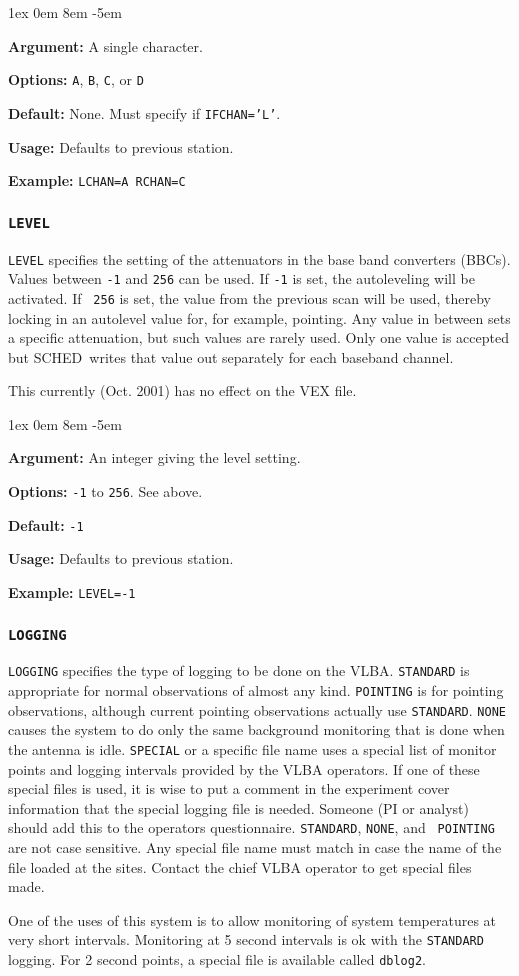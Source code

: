 \documentclass{report}
\newcommand{\schedb}{{\sc SCHED~}}
\newcommand{\rcwbox}[5]{
  \begin{list}{}{\parsep 1ex  \itemsep 0em
                 \leftmargin 8em  \itemindent -5em }
    \item {\bf Argument:} #1
    \item {\bf Options:}  #2
    \item {\bf Default:}  #3
    \item {\bf Usage:}    #4
    \item {\bf Example:}  #5
  \end{list}
}
\begin{document}
\rcwbox
{A single character.}
{{\tt A}, {\tt B}, {\tt C}, or {\tt D}}
{None. Must specify if {\tt IFCHAN='L'}.}
{Defaults to previous station.}
{{\tt LCHAN=A  RCHAN=C}}


\subsubsection{\label{SP:LEVEL}{\tt LEVEL}}

{\tt LEVEL} specifies the setting of the attenuators in the base band
converters (BBCs). Values between {\tt -1} and {\tt 256} can be
used. If {\tt -1} is set, the autoleveling will be activated. If {\tt
256} is set, the value from the previous scan will be used, thereby
locking in an autolevel value for, for example, pointing. Any value in
between sets a specific attenuation, but such values are rarely
used. Only one value is accepted but \schedb writes that value out
separately for each baseband channel.

This currently (Oct. 2001) has no effect on the VEX file.


\rcwbox
{An integer giving the level setting.}
{{\tt -1} to {\tt 256}. See above.}
{{\tt -1}}
{Defaults to previous station.}
{{\tt LEVEL=-1}}


\subsubsection{\label{SP:LOGGING}{\tt LOGGING}}

{\tt LOGGING} specifies the type of logging to be done on the
VLBA. {\tt STANDARD} is appropriate for normal observations of almost
any kind.  {\tt POINTING} is for pointing observations, although
current pointing observations actually use {\tt STANDARD}.  {\tt NONE}
causes the system to do only the same background monitoring that is
done when the antenna is idle.  {\tt SPECIAL} or a specific file name
uses a special list of monitor points and logging intervals provided
by the VLBA operators.  If one of these special files is used, it is
wise to put a comment in the experiment cover information that the
special logging file is needed.  Someone (PI or analyst) should add
this to the operators questionnaire. {\tt STANDARD}, {\tt NONE}, and {\tt
POINTING} are not case sensitive.  Any special file name must match
in case the name of the file loaded at the sites.  Contact the chief
VLBA operator to get special files made.

One of the uses of this system is to allow monitoring of system
temperatures at very short intervals.  Monitoring at 5 second intervals
is ok with the {\tt STANDARD} logging.  For 2 second points, a special
file is available called {\tt dblog2}.
\end{document}
